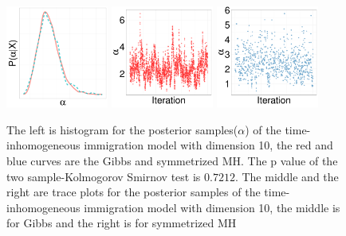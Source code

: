 {  \begin{figure}[H]
  \centering
  \begin{minipage}[!hp]{0.97\linewidth}
    \includegraphics [width=0.30\textwidth, angle=0]{figs/QC_ks/qc_hist_4_03_10_.pdf}
    \includegraphics [width=0.30\textwidth, angle=0]{figs/QC_ks/qc_traceGBS_4_03_10_.pdf}
    \includegraphics [width=0.30\textwidth, angle=0]{figs/QC_ks/qc_traceMH_4_03_10_.pdf}
  \end{minipage}

    \caption{The left is histogram for the posterior samples($\alpha$) of the time-inhomogeneous immigration model with dimension 10, the red and blue curves are the Gibbs and symmetrized MH. The p value of the two sample-Kolmogorov Smirnov test is $ 0.7212$. The middle and the right are trace plots for the posterior samples of the time-inhomogeneous immigration model with dimension 10, the middle is for Gibbs and the right is for symmetrized MH}
     \label{fig:TRACE_CQ}
  \end{figure}

}

